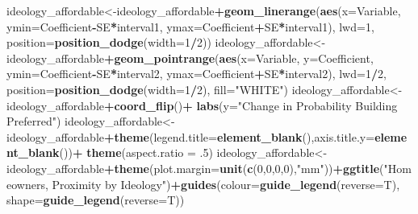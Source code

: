 \documentclass[]{article}
\newenvironment{Shaded}{\begin{snugshade}}{\end{snugshade}}
\newcommand{\DataTypeTok}[1]{\textcolor[rgb]{0.13,0.29,0.53}{#1}}
\newcommand{\DecValTok}[1]{\textcolor[rgb]{0.00,0.00,0.81}{#1}}
\newcommand{\FloatTok}[1]{\textcolor[rgb]{0.00,0.00,0.81}{#1}}
\newcommand{\KeywordTok}[1]{\textcolor[rgb]{0.13,0.29,0.53}{\textbf{#1}}}
\newcommand{\NormalTok}[1]{#1}
\newcommand{\OperatorTok}[1]{\textcolor[rgb]{0.81,0.36,0.00}{\textbf{#1}}}
\newcommand{\StringTok}[1]{\textcolor[rgb]{0.31,0.60,0.02}{#1}}
\begin{document}
\begin{Shaded}
\begin{Highlighting}[]
{{{\NormalTok{ideology_affordable<-ideology_affordable}\OperatorTok{+}\KeywordTok{geom_linerange}\NormalTok{(}\KeywordTok{aes}\NormalTok{(}\DataTypeTok{x=}\NormalTok{Variable, }\DataTypeTok{ymin=}\NormalTok{Coefficient}\OperatorTok{-}\NormalTok{SE}\OperatorTok{*}\NormalTok{interval1, }
                                                            \DataTypeTok{ymax=}\NormalTok{Coefficient}\OperatorTok{+}\NormalTok{SE}\OperatorTok{*}\NormalTok{interval1), }\DataTypeTok{lwd=}\DecValTok{1}\NormalTok{, }\DataTypeTok{position=}\KeywordTok{position_dodge}\NormalTok{(}\DataTypeTok{width=}\DecValTok{1}\OperatorTok{/}\DecValTok{2}\NormalTok{))}
\NormalTok{ideology_affordable<-ideology_affordable}\OperatorTok{+}\KeywordTok{geom_pointrange}\NormalTok{(}\KeywordTok{aes}\NormalTok{(}\DataTypeTok{x=}\NormalTok{Variable, }\DataTypeTok{y=}\NormalTok{Coefficient, }\DataTypeTok{ymin=}\NormalTok{Coefficient}\OperatorTok{-}\NormalTok{SE}\OperatorTok{*}\NormalTok{interval2,}
                                                             \DataTypeTok{ymax=}\NormalTok{Coefficient}\OperatorTok{+}\NormalTok{SE}\OperatorTok{*}\NormalTok{interval2), }\DataTypeTok{lwd=}\DecValTok{1}\OperatorTok{/}\DecValTok{2}\NormalTok{,}
                                                         \DataTypeTok{position=}\KeywordTok{position_dodge}\NormalTok{(}\DataTypeTok{width=}\DecValTok{1}\OperatorTok{/}\DecValTok{2}\NormalTok{),  }\DataTypeTok{fill=}\StringTok{"WHITE"}\NormalTok{)}
\NormalTok{ideology_affordable<-ideology_affordable}\OperatorTok{+}\KeywordTok{coord_flip}\NormalTok{()}\OperatorTok{+}\StringTok{ }\KeywordTok{labs}\NormalTok{(}\DataTypeTok{y=}\StringTok{"Change in Probability Building Preferred"}\NormalTok{)}
\NormalTok{ideology_affordable<-ideology_affordable}\OperatorTok{+}\KeywordTok{theme}\NormalTok{(}\DataTypeTok{legend.title=}\KeywordTok{element_blank}\NormalTok{(),}\DataTypeTok{axis.title.y=}\KeywordTok{element_blank}\NormalTok{())}\OperatorTok{+}\StringTok{ }\KeywordTok{theme}\NormalTok{(}\DataTypeTok{aspect.ratio =} \FloatTok{.5}\NormalTok{)}
\NormalTok{ideology_affordable<-ideology_affordable}\OperatorTok{+}\KeywordTok{theme}\NormalTok{(}\DataTypeTok{plot.margin=}\KeywordTok{unit}\NormalTok{(}\KeywordTok{c}\NormalTok{(}\DecValTok{0}\NormalTok{,}\DecValTok{0}\NormalTok{,}\DecValTok{0}\NormalTok{,}\DecValTok{0}\NormalTok{),}\StringTok{"mm"}\NormalTok{))}\OperatorTok{+}\KeywordTok{ggtitle}\NormalTok{(}\StringTok{"Homeowners, Proximity by Ideology"}\NormalTok{)}\OperatorTok{+}\KeywordTok{guides}\NormalTok{(}\DataTypeTok{colour=}\KeywordTok{guide_legend}\NormalTok{(}\DataTypeTok{reverse=}\NormalTok{T), }\DataTypeTok{shape=}\KeywordTok{guide_legend}\NormalTok{(}\DataTypeTok{reverse=}\NormalTok{T))}


}}}
\end{Highlighting}
\end{Shaded}
\end{document}
